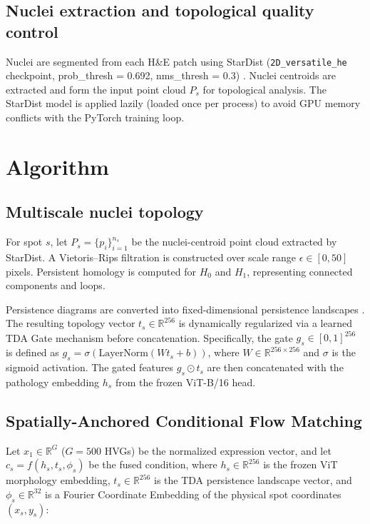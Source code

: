 \documentclass[nocrop]{bioinfo}
\begin{document}
\subsection{Nuclei extraction and topological quality control}

Nuclei are segmented from each H\&E patch using StarDist (\texttt{2D\_versatile\_he} checkpoint, prob\_thresh = 0.692, nms\_thresh = 0.3) \citep{schmidt2018stardist}. Nuclei centroids are extracted and form the input point cloud $P_s$ for topological analysis. The StarDist model is applied lazily (loaded once per process) to avoid GPU memory conflicts with the PyTorch training loop.

\section{Algorithm}

\subsection{Multiscale nuclei topology}

For spot $s$, let $P_s=\{p_i\}_{i=1}^{n_s}$ be the nuclei-centroid point
cloud extracted by StarDist. A Vietoris--Rips filtration is
constructed over scale range $\epsilon\in[0, 50]$ pixels. Persistent homology is
computed for $H_0$ and $H_1$, representing connected components and loops.

Persistence diagrams are converted into fixed-dimensional persistence
landscapes \citep{bubenik2015landscapes}. The resulting topology vector $t_s \in \mathbb{R}^{256}$
is dynamically regularized via a learned TDA Gate mechanism before concatenation.
Specifically, the gate $g_s \in [0, 1]^{256}$ is defined as $g_s = \sigma(\text{LayerNorm}(W t_s + b))$,
where $W \in \mathbb{R}^{256 \times 256}$ and $\sigma$ is the sigmoid activation. The gated features $g_s \odot t_s$ are then concatenated with the pathology embedding $h_s$ from the frozen ViT-B/16 head.

\subsection{Spatially-Anchored Conditional Flow Matching}

Let $x_1\in\mathbb{R}^{G}$ ($G = 500$ HVGs) be the normalized expression vector,
and let $c_s = f(h_s, t_s, \phi_s)$ be the fused condition, where $h_s \in \mathbb{R}^{256}$
is the frozen ViT morphology embedding, $t_s \in \mathbb{R}^{256}$ is the TDA persistence
landscape vector, and $\phi_s \in \mathbb{R}^{32}$ is a Fourier Coordinate Embedding of the
physical spot coordinates $(x_s, y_s)$:
\end{document}
